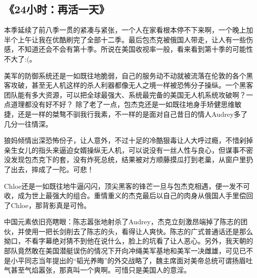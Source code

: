 \subsection{《24小时：再活一天》}
本季延续了前八季一贯的紧凑与紧张，一个人在家看根本停不下来啊，一个晚上加半个上午让我在优酷刷完了全部十二季。最后包杰克被俄国人带走，让人有一些伤感，不知道还会不会有第十季。所说在美国收视率一般，看来看到第十季的可能性不大了:(。

美军的防御系统还是一如既往地脆弱，自己的服务动不动就被流落在伦敦的各个黑客攻破，甚至无人机这样的杀人利器都像无人之境一样被恐怖分子操纵。一个黑客团队能有多大资源，可以把全球最强大、系统最完备的美国无人机系统攻破啊？一点道理都没有好不好？
除了老了一点，包杰克还是一如既往地身手矫健思维敏捷，还是一样的桀骜不驯我行我素，不一样的是面对自己昔日的情人Audrey多了几分一往情深。

狼妈倾情出深恐怖份子，让人意外，不过十足的冷酷狠毒让人大呼过瘾，不惜剁掉亲生女儿的指头来逼迫女婿操纵无人机，可以说没有一丝人性与良心，但谋事不密没发现包杰克下的套，没有炸死总统，结果被对方顺藤摸瓜打到老巢，从窗户里扔了出去，摔成了一陀。可悲！

Chloe还是一如既往地牛逼闪闪，顶尖黑客的锋芒一旦与包杰克相遇，便一发不可收，成为世上最强大的组合。重情重义的杰克最后以自己的肉身从俄国人手里偿回了Chloe，那背影真是可怜。

中国元素依旧亮瞎眼：陈志嚣张地射杀了Audrey，杰克立刻激昂端掉了陈志的团伙，并使用一把长剑削去了陈志的头，看得让人爽快。陈志的广式普通话还是那么拗口，不看字幕绝对猜不到他在说什么，脸上的坑看了让人恶心。另外，我天朝的部队竟然敢在美国潜艇误伤的情况下开向冲绳美军基地和美军一决雌雄，可见已不是小平同志当年提出的“韬光养晦”的外交战略了，魏主席面对美帝总统可谓扬眉吐气甚至气焰嚣张，那真叫一个爽啊。可惜只是美国人的意淫。